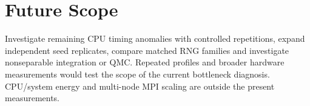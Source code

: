\section{Future Scope}
Investigate remaining CPU timing anomalies with controlled repetitions,
expand independent seed
replicates, compare matched RNG families and investigate nonseparable
integration or QMC. Repeated profiles and broader hardware measurements would
test the scope of the current bottleneck diagnosis. CPU/system energy and
multi-node MPI scaling are outside the present measurements.
